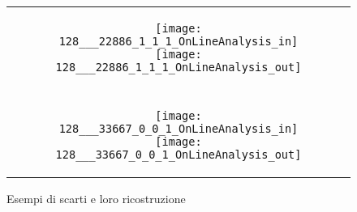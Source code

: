 \begin{figure}[ht] %
  \begin{center}
    \begin{tabular}{c}



      \begin{subfigure}{\linewidth}
        \begin{center}
          \texttt{[image: 128\_\_\_22886\_1\_1\_1\_OnLineAnalysis\_in]}
          \texttt{[image: 128\_\_\_22886\_1\_1\_1\_OnLineAnalysis\_out]}
        \end{center}
      \end{subfigure} \\ \\

      \begin{subfigure}{\linewidth}
        \begin{center}
          \texttt{[image: 128\_\_\_33667\_0\_0\_1\_OnLineAnalysis\_in]}
          \texttt{[image: 128\_\_\_33667\_0\_0\_1\_OnLineAnalysis\_out]}
        \end{center}
      \end{subfigure}

    \end{tabular}
    \caption{Esempi di scarti e loro ricostruzione}
    \label{fig:scarti_in_out}
  \end{center}
\end{figure}

